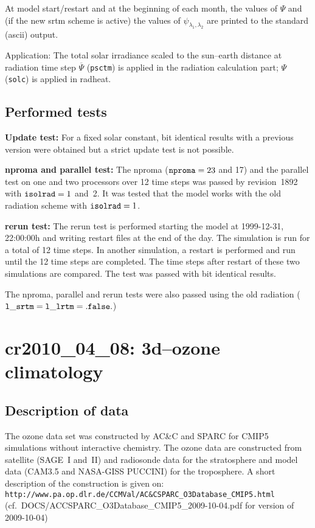 \begin{appendix}
At model start/restart and at the beginning of each month, the values
of $\Psi$ and (if the new srtm scheme is active) the values of
$\psi_{\lambda_1,\lambda_2}$ are printed to the standard (ascii)
\echam{} output.

Application: The total solar irradiance scaled to the sun--earth
distance at radiation time step $\overline{\Psi}$ ({\tt psctm}) is
applied in the radiation calculation part; $\Psi$ ({\tt solc}) is
applied in radheat. 
\subsection{Performed tests}

{\bf Update test:} For a fixed solar constant,
bit identical results with a previous version were obtained but a strict
update test is not possible.

{\bf nproma and parallel test:} The nproma (${\tt nproma}=23$ and 17)
and the parallel test on one and two 
processors over 12 time steps was passed by revision~1892 with ${\tt
  isolrad}=1$ and~2.
It was tested that the model works with the old 
radiation scheme with ${\tt isolrad}=1$.

{\bf rerun test:} The rerun test is performed starting the model at
1999-12-31, 22:00:00h and writing restart files at the end of the
day. The simulation is run for a total of 12 time steps. In another
simulation, a restart is performed and run until the 12 time steps are
completed. The time steps after restart of these two simulations are
compared. The test was passed with bit identical results.

The nproma, parallel and rerun tests were also passed using the old
radiation (${\tt l\_srtm} = {\tt l\_lrtm} = {\tt .false.}$) 

\clearpage\newpage
\section{cr2010\_04\_08: 3d--ozone climatology}\label{cr20100408}

\subsection{Description of data}

The ozone data set was constructed by AC\&C and SPARC for CMIP5 simulations
without interactive chemistry. The ozone data are constructed from
satellite (SAGE~I and~II) and radiosonde data for the stratosphere
and model data (CAM3.5 and NASA-GISS PUCCINI) for the troposphere.
A short description of the construction is given on:
\newline
{\tt http://www.pa.op.dlr.de/CCMVal/AC\&CSPARC\_O3Database\_CMIP5.html}\newline
(cf.~DOCS/ACCSPARC\_O3Database\_CMIP5\_2009-10-04.pdf for version of
2009-10-04)


\end{appendix}
